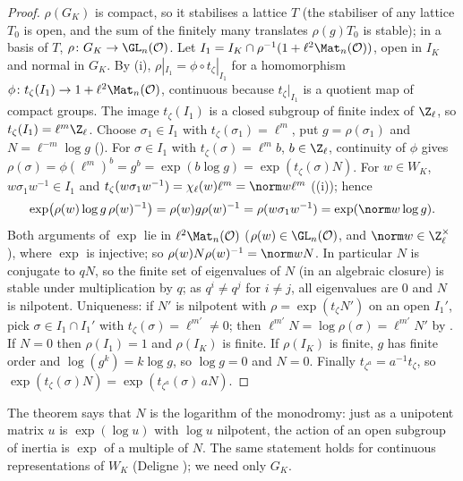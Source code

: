 \begin{proof}
$\rho(G_K)$ is compact, so it stabilises a lattice $T$ (the stabiliser of any lattice $T_0$ is open, and the sum of the finitely many translates
$\rho(g)T_0$ is stable); in a basis of $T$, $\rho\colon G_K\to\GL_n(\mathcal O)$. Let $I_1=I_K\cap\rho^{-1}(1+\ell^2\Mat_n(\mathcal O))$, open in $I_K$ and normal in $G_K$.
By (i), $\rho|_{I_1}=\phi\circ t_\zeta|_{I_1}$ for a homomorphism $\phi\colon t_\zeta(I_1)\to1+\ell^2\Mat_n(\mathcal O)$, continuous because
$t_\zeta|_{I_1}$ is a quotient map of compact groups. The image $t_\zeta(I_1)$ is a closed subgroup of finite index of $\Z_\ell$, so $t_\zeta(I_1)=\ell^m\Z_\ell$. Choose
$\sigma_1\in I_1$ with $t_\zeta(\sigma_1)=\ell^m$, put $g=\rho(\sigma_1)$ and $N=\ell^{-m}\log g$ (). For $\sigma\in I_1$ with $t_\zeta(\sigma)=\ell^mb$, $b\in\Z_\ell$,
continuity of $\phi$ gives $\rho(\sigma)=\phi(\ell^m)^b=g^b=\exp(b\log g)=\exp(t_\zeta(\sigma)N)$. For $w\in W_K$, $w\sigma_1w^{-1}\in I_1$ and $t_\zeta(w\sigma_1w^{-1})=\chi_\ell(w)\ell^m=\norm w\ell^m$
((i)); hence
\[
\exp\bigl(\rho(w)\log g\,\rho(w)^{-1}\bigr)=\rho(w)g\rho(w)^{-1}=\rho(w\sigma_1w^{-1})=\exp(\norm w\log g).
\]
Both arguments of $\exp$ lie in $\ell^2\Mat_n(\mathcal O)$ ($\rho(w)\in\GL_n(\mathcal O)$, and $\norm w\in\Z_\ell^\times$), where $\exp$ is injective; so $\rho(w)N\rho(w)^{-1}=\norm wN$. In
particular $N$ is conjugate to $qN$, so the finite set of eigenvalues of $N$ (in an algebraic closure) is stable under multiplication by $q$; as
$q^i\ne q^j$ for $i\ne j$, all eigenvalues are $0$ and $N$ is nilpotent. Uniqueness: if $N'$ is nilpotent with $\rho=\exp(t_\zeta N')$ on an open $I_1'$, pick
$\sigma\in I_1\cap I_1'$ with $t_\zeta(\sigma)=\ell^{m'}\ne0$; then $\ell^{m'}N=\log\rho(\sigma)=\ell^{m'}N'$ by . If $N=0$ then $\rho(I_1)=1$ and
$\rho(I_K)$ is finite. If $\rho(I_K)$ is finite, $g$ has finite order and $\log(g^k)=k\log g$, so $\log g=0$ and $N=0$. Finally $t_{\zeta^a}=a^{-1}t_\zeta$, so
$\exp(t_\zeta(\sigma)N)=\exp(t_{\zeta^a}(\sigma)\,aN)$.
\end{proof}

The theorem says that $N$ is the logarithm of the monodromy: just as a unipotent matrix $u$ is $\exp(\log u)$ with $\log u$ nilpotent, the action of
an open subgroup of inertia is $\exp$ of a multiple of $N$. The same statement holds for continuous representations of $W_K$ (Deligne
\cite[Section 8]{Deligne73}); we need only $G_K$.


